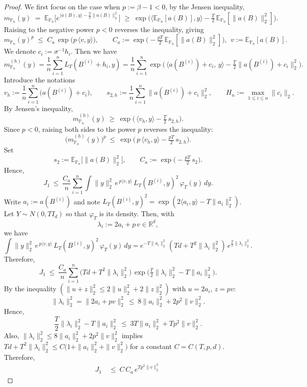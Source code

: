 \documentclass[11pt]{article}
\theoremstyle{definition}
\newcommand{\R}{\mathbb{R}}
\newcommand{\E}{\mathbb{E}}
\begin{document}
\begin{proof}
We first focus on the case when $p:= \beta - 1 < 0$, by the Jensen inequality,
\[
m_{\mathbb{P}_n}(y) \;=\; \E_{\mathbb{P}_n}\big[e^{\langle a(B),y\rangle-\frac{T}{2}\|a(B)\|_2^2}\big]
\;\ge\;
\exp\!\Big( \langle \E_{\mathbb{P}_n}[a(B)],y\rangle - \tfrac{T}{2}\,\E_{\mathbb{P}_n}\left[\|a(B)\|_2^2\right] \Big).
\]
Raising to the negative power $p<0$ reverses the inequality, giving
$$
m_{\mathbb{P}_n}(y)^{p}\;\le\;C_a\,\exp\!\big(p\,\langle v,y\rangle\big),
\qquad
C_a:=\exp\!\Big(-\tfrac{p T}{2}\,\E_{\mathbb{P}_n}\left[\|a(B)\|_2^2\right]\Big),\ \ 
v:=\E_{\mathbb{P}_n}[a(B)].
$$
We denote $c_i:=\sigma^{-1}h_i$. Then we have 
\[
m_{\mathbb{P}_n}^{(h)}(y)=\frac1n\sum_{i=1}^n L_T(B^{(i)}+h_i,y)
=\frac1n\sum_{i=1}^n \exp\!\Big(\,\big\langle a(B^{(i)})+c_i,\,y\big\rangle-\tfrac{T}{2}\|a(B^{(i)})+c_i\|_2^2\Big).
\]
Introduce the notations
\[
v_h:=\frac1n\sum_{i=1}^n \big(a(B^{(i)})+c_i\big), 
\qquad
s_{2,h}:=\frac1n\sum_{i=1}^n \|a(B^{(i)})+c_i\|_2^2,
\qquad
H_n:=\max_{1\le i\le n}\|c_i\|_2.
\]
By {Jensen's inequality},
\[
m_{\mathbb{P}_n}^{(h)}(y)\ \ge\ \exp\!\Big(\,\langle v_h,y\rangle-\tfrac{T}{2}\,s_{2,h}\Big).
\]
Since $p<0$, raising both sides to the power $p$ reverses the inequality:
\[
\big(m_{\mathbb{P}_n}^{(h)}(y)\big)^{p}
\ \le\ \exp\!\Big(\,p\,\langle v_h,y\rangle-\tfrac{pT}{2}\,s_{2,h}\Big).
\]
Set
\[
s_2:=\E_{\mathbb{P}_n}\!\big[\|a(B)\|_2^2\big],\qquad
C_a:=\exp\!\Big(-\tfrac{pT}{2}\,s_2\Big).
\]
Hence, 
\[
J_1
\ \le\ \frac{C_a}{n}\sum_{i=1}^n
\int \|y\|_2^2\,e^{\,p\langle v,y\rangle}\,L_T(B^{(i)},y)^2\,\varphi_T(y)\,dy.
\]
Write $a_i:=a(B^{(i)})$ and note $L_T(B^{(i)},y)^2=\exp(2\langle a_i,y\rangle - T\|a_i\|_2^2)$.
Let $Y\sim N(0,TI_d)$ so that $\varphi_T$ is its density. Then, with
\[
\lambda_i:=2a_i+p\,v\in\R^d,
\]
we have 
\[
\int \|y\|_2^2\,e^{\,p\langle v,y\rangle}\,L_T(B^{(i)},y)^2\,\varphi_T(y)\,dy
= e^{-T\|a_i\|_2^2}\,(Td+T^2\|\lambda_i\|_2^2)\,e^{\frac{T}{2}\|\lambda_i\|_2^2}.
\]
Therefore,
$$ 
J_1
\ \le\ \frac{C_a}{n}\sum_{i=1}^n
\Big(Td+T^2\|\lambda_i\|_2^2\Big)\,
\exp\!\Big(\tfrac{T}{2}\|\lambda_i\|_2^2 - T\|a_i\|_2^2\Big).$$
By the inequality $(\|u+z\|_2^2\le 2\|u\|_2^2+2\|z\|_2^2)$ with $u=2a_i$, $z=pv$:
\[
\|\lambda_i\|_2^2=\|2a_i+p v\|_2^2 \ \le\ 8\|a_i\|_2^2 + 2p^2\|v\|_2^2.
\]
Hence, 
\[
\frac{T}{2}\|\lambda_i\|_2^2 - T\|a_i\|_2^2
\ \le\ 3T\|a_i\|_2^2 + T p^2\|v\|_2^2.
\]
Also, $\|\lambda_i\|_2^2\le 8\|a_i\|_2^2+2p^2\|v\|_2^2$ implies
\(
Td+T^2\|\lambda_i\|_2^2
\le C\big(1+\|a_i\|_2^2+\|v\|_2^2\big)
\)
for a constant $C=C(T,p,d)$.
Therefore,
\begin{align*}
  J_1
\ &\le\ C\,C_a\,e^{Tp^2\|v\|_2^2}\,

\end{align*}
\end{proof}
\end{document}
